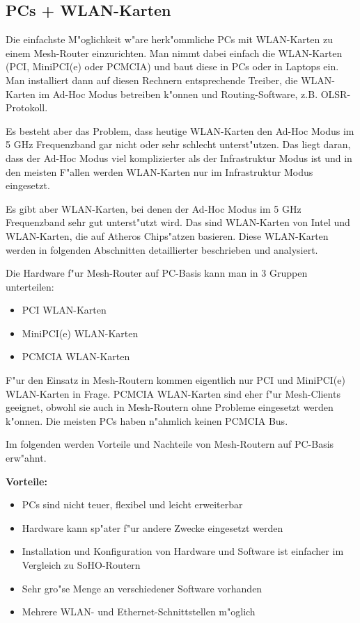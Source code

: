 \subsection{PCs + WLAN-Karten}

Die einfachste M"oglichkeit w"are herk"ommliche PCs mit
WLAN-Karten zu einem Mesh-Router einzurichten.  Man nimmt dabei
einfach die WLAN-Karten (PCI, MiniPCI(e) oder PCMCIA) und baut diese
in PCs oder in Laptops ein. Man installiert dann auf diesen Rechnern
entsprechende Treiber, die WLAN-Karten im Ad-Hoc Modus betreiben k"onnen
und Routing-Software, z.B. OLSR-Protokoll.

Es besteht aber das Problem, dass heutige WLAN-Karten den Ad-Hoc Modus im 5 GHz
Frequenzband gar nicht oder sehr schlecht unterst"utzen. Das liegt daran,
dass der Ad-Hoc Modus viel komplizierter als der Infrastruktur Modus ist und
in den meisten F"allen werden WLAN-Karten nur im Infrastruktur Modus
eingesetzt.

Es gibt aber WLAN-Karten, bei denen der Ad-Hoc Modus im 5 GHz Frequenzband
sehr gut unterst"utzt wird. Das sind WLAN-Karten von Intel und WLAN-Karten,
die auf Atheros Chips"atzen basieren. Diese WLAN-Karten werden 
in folgenden Abschnitten detaillierter beschrieben und analysiert.

Die Hardware f"ur Mesh-Router auf PC-Basis kann man in 3 Gruppen unterteilen:

\begin{itemize}
\item PCI WLAN-Karten
\item MiniPCI(e) WLAN-Karten
\item PCMCIA WLAN-Karten
\end{itemize}

F"ur den Einsatz in Mesh-Routern kommen eigentlich nur PCI und MiniPCI(e)
WLAN-Karten in Frage. PCMCIA WLAN-Karten sind eher f"ur Mesh-Clients geeignet,
obwohl sie auch in Mesh-Routern ohne Probleme eingesetzt werden k"onnen.
Die meisten PCs haben n"ahmlich keinen PCMCIA Bus.

Im folgenden werden Vorteile und Nachteile von Mesh-Routern auf PC-Basis
erw"ahnt.

\textbf{Vorteile:}

\begin{itemize} 
\item PCs sind nicht teuer, flexibel und leicht erweiterbar
\item Hardware kann sp"ater f"ur andere Zwecke eingesetzt werden
\item Installation und Konfiguration von Hardware und Software ist einfacher
im Vergleich zu SoHO-Routern
\item Sehr gro"se Menge an verschiedener Software vorhanden
\item Mehrere WLAN- und Ethernet-Schnittstellen m"oglich 
\end{itemize}

